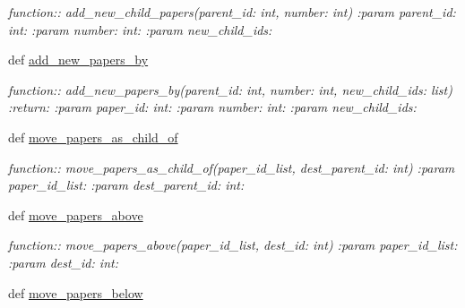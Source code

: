 \begin{DoxyCompactItemize}
\begin{DoxyCompactList}\small\item\em function\+:\+: add\+\_\+new\+\_\+child\+\_\+papers(parent\+\_\+id\+: int, number\+: int) \+:param parent\+\_\+id\+: int\+: \+:param number\+: int\+: \+:param new\+\_\+child\+\_\+ids\+: \end{DoxyCompactList}\item 
def \hyperlink{classplume-creator_1_1src_1_1plume_1_1data_1_1tree_1_1tree_1_1_tree_a33a07da05e7f624c80480422cc8f72d9}{add\+\_\+new\+\_\+papers\+\_\+by}\hypertarget{classplume-creator_1_1src_1_1plume_1_1data_1_1tree_1_1tree_1_1_tree_a33a07da05e7f624c80480422cc8f72d9}{}\label{classplume-creator_1_1src_1_1plume_1_1data_1_1tree_1_1tree_1_1_tree_a33a07da05e7f624c80480422cc8f72d9}

\begin{DoxyCompactList}\small\item\em function\+:\+: add\+\_\+new\+\_\+papers\+\_\+by(parent\+\_\+id\+: int, number\+: int, new\+\_\+child\+\_\+ids\+: list) \+:return\+: \+:param paper\+\_\+id\+: int\+: \+:param number\+: int\+: \+:param new\+\_\+child\+\_\+ids\+: \end{DoxyCompactList}\item 
def \hyperlink{classplume-creator_1_1src_1_1plume_1_1data_1_1tree_1_1tree_1_1_tree_a0ed93cbb2b04639b6868db06cf977fd4}{move\+\_\+papers\+\_\+as\+\_\+child\+\_\+of}\hypertarget{classplume-creator_1_1src_1_1plume_1_1data_1_1tree_1_1tree_1_1_tree_a0ed93cbb2b04639b6868db06cf977fd4}{}\label{classplume-creator_1_1src_1_1plume_1_1data_1_1tree_1_1tree_1_1_tree_a0ed93cbb2b04639b6868db06cf977fd4}

\begin{DoxyCompactList}\small\item\em function\+:\+: move\+\_\+papers\+\_\+as\+\_\+child\+\_\+of(paper\+\_\+id\+\_\+list, dest\+\_\+parent\+\_\+id\+: int) \+:param paper\+\_\+id\+\_\+list\+: \+:param dest\+\_\+parent\+\_\+id\+: int\+: \end{DoxyCompactList}\item 
def \hyperlink{classplume-creator_1_1src_1_1plume_1_1data_1_1tree_1_1tree_1_1_tree_a5b7a34644a7c305a4d4a87ca3a32743f}{move\+\_\+papers\+\_\+above}\hypertarget{classplume-creator_1_1src_1_1plume_1_1data_1_1tree_1_1tree_1_1_tree_a5b7a34644a7c305a4d4a87ca3a32743f}{}\label{classplume-creator_1_1src_1_1plume_1_1data_1_1tree_1_1tree_1_1_tree_a5b7a34644a7c305a4d4a87ca3a32743f}

\begin{DoxyCompactList}\small\item\em function\+:\+: move\+\_\+papers\+\_\+above(paper\+\_\+id\+\_\+list, dest\+\_\+id\+: int) \+:param paper\+\_\+id\+\_\+list\+: \+:param dest\+\_\+id\+: int\+: \end{DoxyCompactList}\item 
def \hyperlink{classplume-creator_1_1src_1_1plume_1_1data_1_1tree_1_1tree_1_1_tree_aa1dd8db1ab8f7d7b6afb1d0852abb854}{move\+\_\+papers\+\_\+below}\hypertarget{classplume-creator_1_1src_1_1plume_1_1data_1_1tree_1_1tree_1_1_tree_aa1dd8db1ab8f7d7b6afb1d0852abb854}{}\label{classplume-creator_1_1src_1_1plume_1_1data_1_1tree_1_1tree_1_1_tree_aa1dd8db1ab8f7d7b6afb1d0852abb854}


\end{DoxyCompactItemize}
